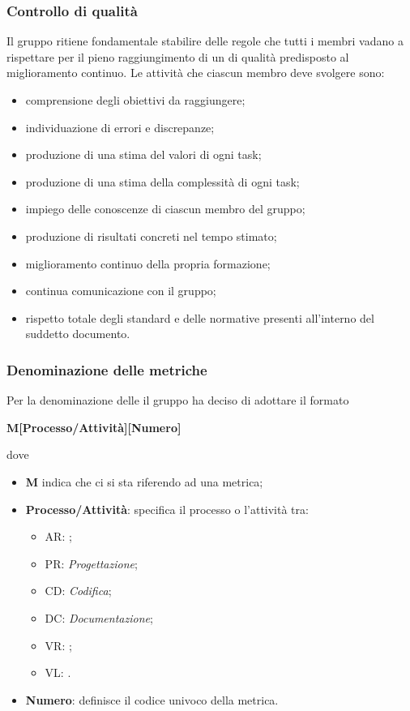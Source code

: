 \subsubsection{Controllo di qualità}
Il gruppo \textit{\Gruppo{}} ritiene fondamentale stabilire delle regole che tutti i membri vadano a rispettare per il pieno raggiungimento di un  di qualità predisposto al miglioramento continuo.
Le attività che ciascun membro deve svolgere sono:
\begin{itemize}
	\item comprensione degli obiettivi da raggiungere;
	\item individuazione di errori e discrepanze;
	\item produzione di una stima del valori di ogni task;
	\item produzione di una stima della complessità di ogni task;
	\item impiego delle conoscenze di ciascun membro del gruppo;
	\item produzione di risultati concreti nel tempo stimato;
	\item miglioramento continuo della propria formazione;
	\item continua comunicazione con il gruppo;
	\item rispetto totale degli standard e delle normative presenti all'interno del suddetto documento.
\end{itemize} 
\subsubsection{Denominazione delle metriche}
Per la denominazione delle  il gruppo ha deciso di adottare il formato\newline \centerline{\textbf{M[Processo/Attività][Numero]}}\newline
dove
\begin{itemize}
	\item \textbf{M} indica che ci si sta riferendo ad una metrica;
	\item \textbf{Processo/Attività}: specifica il processo o l'attività tra:
	\begin{itemize}
		\item AR: \AdR{};
		\item PR: \emph{Progettazione};
		\item CD: \emph{Codifica};
		\item DC: \emph{Documentazione};
		\item VR: \emph{};
		\item VL: \emph{}.
	\end{itemize}
	\item \textbf{Numero}: definisce il codice univoco della metrica.
\end{itemize}
